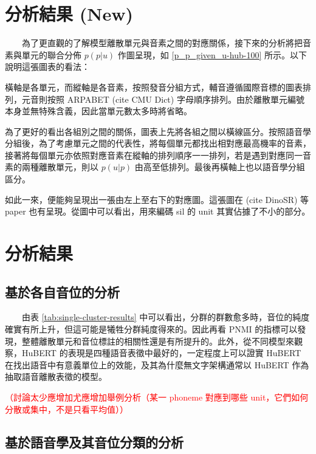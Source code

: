 
\setcounter{section}{4}

\section{分析結果 (New)}



　　為了更直觀的了解模型離散單元與音素之間的對應關係，接下來的分析將把音素與單元的聯合分佈 \(p(p|u)\) 作圖呈現，如 \ref{p_p_given_u-hub-100} 所示。以下說明這張圖表的看法：

        橫軸是各單元，而縱軸是各音素，按照發音分組方式，輔音遵循國際音標的圖表排列，元音則按照 ARPABET (cite CMU Dict) 字母順序排列。由於離散單元編號本身並無特殊含義，因此當單元數太多時將省略。

        為了更好的看出各組別之間的關係，圖表上先將各組之間以橫線區分。按照語音學分組後，為了考慮單元之間的代表性，將每個單元都找出相對應最高機率的音素，接著將每個單元亦依照對應音素在縱軸的排列順序一一排列，若是遇到對應同一音素的兩種離散單元，則以 \(p(u|p) \) 由高至低排列。最後再橫軸上也以語音學分組區分。

        如此一來，便能夠呈現出一張由左上至右下的對應圖。這張圖在 (cite DinoSR) 等 paper 也有呈現。從圖中可以看出，用來編碼 sil 的 unit 其實佔據了不小的部分。

\setcounter{section}{4}

\section{分析結果}

\subsection{基於各自音位的分析}



　　由表 \ref{tab:single-cluster-results} 中可以看出，分群的群數愈多時，音位的純度確實有所上升，但這可能是犧牲分群純度得來的。因此再看 PNMI 的指標可以發現，整體離散單元和音位標註的相關性還是有所提升的。此外，從不同模型來觀察，HuBERT 的表現是四種語音表徵中最好的，一定程度上可以證實 HuBERT 在找出語音中有意義單位上的效能，及其為什麼無文字架構通常以 HuBERT 作為抽取語音離散表徵的模型。

\textcolor{red}{（討論太少應增加尤應增加舉例分析（某一 phoneme 對應到哪些 unit，它們如何分散或集中，不是只看平均值））}

\subsection{基於語音學及其音位分類的分析}

